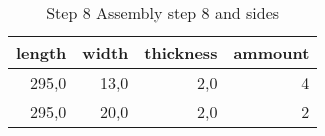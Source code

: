 \begin{table}[h!]
\centering
\caption{Step 8 Assembly step 8 and sides}
\begin{tabular}{rrrr}
\toprule
 length &  width &  thickness &  ammount \\
\midrule
  295,0 &   13,0 &        2,0 &        4 \\
  295,0 &   20,0 &        2,0 &        2 \\
\bottomrule
\end{tabular}
\end{table}
